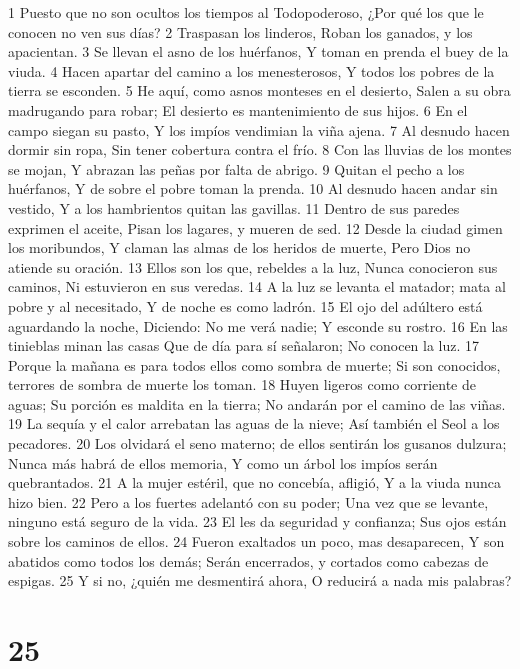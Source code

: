 1 Puesto que no son ocultos los tiempos al Todopoderoso,
¿Por qué los que le conocen no ven sus días?
2 Traspasan los linderos,
Roban los ganados, y los apacientan.
3 Se llevan el asno de los huérfanos,
Y toman en prenda el buey de la viuda.
4 Hacen apartar del camino a los menesterosos,
Y todos los pobres de la tierra se esconden.
5 He aquí, como asnos monteses en el desierto,
Salen a su obra madrugando para robar;
El desierto es mantenimiento de sus hijos.
6 En el campo siegan su pasto,
Y los impíos vendimian la viña ajena.
7 Al desnudo hacen dormir sin ropa,
Sin tener cobertura contra el frío.
8 Con las lluvias de los montes se mojan,
Y abrazan las peñas por falta de abrigo.
9 Quitan el pecho a los huérfanos,
Y de sobre el pobre toman la prenda.
10 Al desnudo hacen andar sin vestido,
Y a los hambrientos quitan las gavillas.
11 Dentro de sus paredes exprimen el aceite,
Pisan los lagares, y mueren de sed.
12 Desde la ciudad gimen los moribundos,
Y claman las almas de los heridos de muerte,
Pero Dios no atiende su oración.
13 Ellos son los que, rebeldes a la luz,
Nunca conocieron sus caminos,
Ni estuvieron en sus veredas.
14 A la luz se levanta el matador; mata al pobre y al necesitado, 
Y de noche es como ladrón.
15 El ojo del adúltero está aguardando la noche,
Diciendo: No me verá nadie;
Y esconde su rostro.
16 En las tinieblas minan las casas
Que de día para sí señalaron;
No conocen la luz.
17 Porque la mañana es para todos ellos como sombra de muerte;
Si son conocidos, terrores de sombra de muerte los toman.
18 Huyen ligeros como corriente de aguas;
Su porción es maldita en la tierra;
No andarán por el camino de las viñas.
19 La sequía y el calor arrebatan las aguas de la nieve; 
Así también el Seol a los pecadores.
20 Los olvidará el seno materno; de ellos sentirán los gusanos dulzura;
Nunca más habrá de ellos memoria,
Y como un árbol los impíos serán quebrantados.
21 A la mujer estéril, que no concebía, afligió,
Y a la viuda nunca hizo bien.
22 Pero a los fuertes adelantó con su poder;
Una vez que se levante, ninguno está seguro de la vida.
23 El les da seguridad y confianza;
Sus ojos están sobre los caminos de ellos.
24 Fueron exaltados un poco, mas desaparecen,
Y son abatidos como todos los demás;
Serán encerrados, y cortados como cabezas de espigas.
25 Y si no, ¿quién me desmentirá ahora,
O reducirá a nada mis palabras?

\chapter{25}

